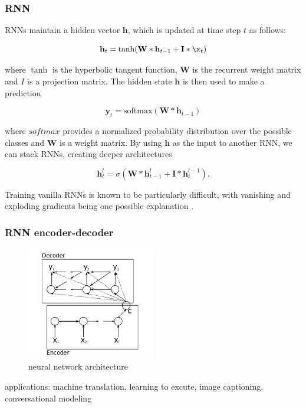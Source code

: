 \documentclass[review]{elsarticle}
\begin{document}
\subsubsection{RNN}
RNNs maintain a hidden vector $\mathbf h$, which is updated at time step $t$ as follows:
 
\begin{equation}
	\mathbf h_t = \tanh(\mathbf W * \mathbf h_{t-1} + \mathbf I * \x_t)
\end{equation}

where $\tanh$ is the hyperbolic tangent function, $\mathbf W$ is the recurrent weight matrix and $I$ is a projection matrix. The hidden state $\mathbf h$ is then used to make a prediction

\begin{equation}
	\mathbf y_t = \text{softmax}(\mathbf W * \mathbf h_{t-1})
\end{equation}

where $\textit{softmax}$ provides a normalized probability distribution over the possible classes and $\mathbf W$ is a weight matrix. By using $\mathbf h$ as the input to another RNN, we can stack RNNs, creating deeper architectures \citep{pascanu2013construct}

\begin{equation}
	\mathbf h_t^{l} = \sigma(\mathbf W * \mathbf h_{t-1}^{l} + \mathbf I * \mathbf h_t^{l-1}).
\end{equation}

Training vanilla RNNs is known to be particularly difficult, with vanishing and exploding gradients being one possible explanation \cite{pascanu2012difficulty}.

\subsubsection{RNN encoder-decoder}
\cite{ChoLearningTranslation}
\begin{figure}[h]
    \centering
    \includegraphics[width=0.5\textwidth]{RNN_encoder-decoder.png}
    \caption{neural network architecture}
    \label{fig:RNN_encoder-decoder}
\end{figure}
applications: machine translation, learning to excute, image captioning, conversational modeling
\end{document}
